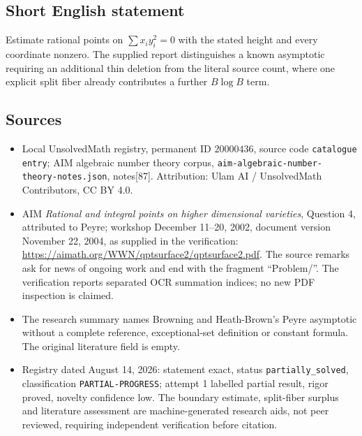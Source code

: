 \documentclass[11pt]{article}
\begin{document}
\subsection{Short English statement}
Estimate rational points on \(\sum x_i y_i^2=0\) with the stated height and every coordinate nonzero. The supplied report distinguishes a known asymptotic requiring an additional thin deletion from the literal source count, where one explicit split fiber already contributes a further \(B\log B\) term.
\subsection{Sources}
\begin{itemize}
\item Local UnsolvedMath registry, permanent ID \(20000436\), source code \texttt{catalogue entry}; AIM algebraic number theory corpus, \texttt{aim-algebraic-number-theory-notes.json}, notes[87]. Attribution: Ulam AI / UnsolvedMath Contributors, CC BY 4.0.
\item AIM \emph{Rational and integral points on higher dimensional varieties}, Question 4, attributed to Peyre; workshop December 11--20, 2002, document version November 22, 2004, as supplied in the verification: \url{https://aimath.org/WWN/qptsurface2/qptsurface2.pdf}. The source remarks ask for news of ongoing work and end with the fragment ``Problem/''. The verification reports separated OCR summation indices; no new PDF inspection is claimed.
\item The research summary names Browning and Heath-Brown's Peyre asymptotic without a complete reference, exceptional-set definition or constant formula. The original literature field is empty.
\item Registry dated August 14, 2026: statement exact, status \texttt{partially\_solved}, classification \texttt{PARTIAL-PROGRESS}; attempt 1 labelled partial result, rigor proved, novelty confidence low. The boundary estimate, split-fiber surplus and literature assessment are machine-generated research aids, not peer reviewed, requiring independent verification before citation.
\end{itemize}
\end{document}
